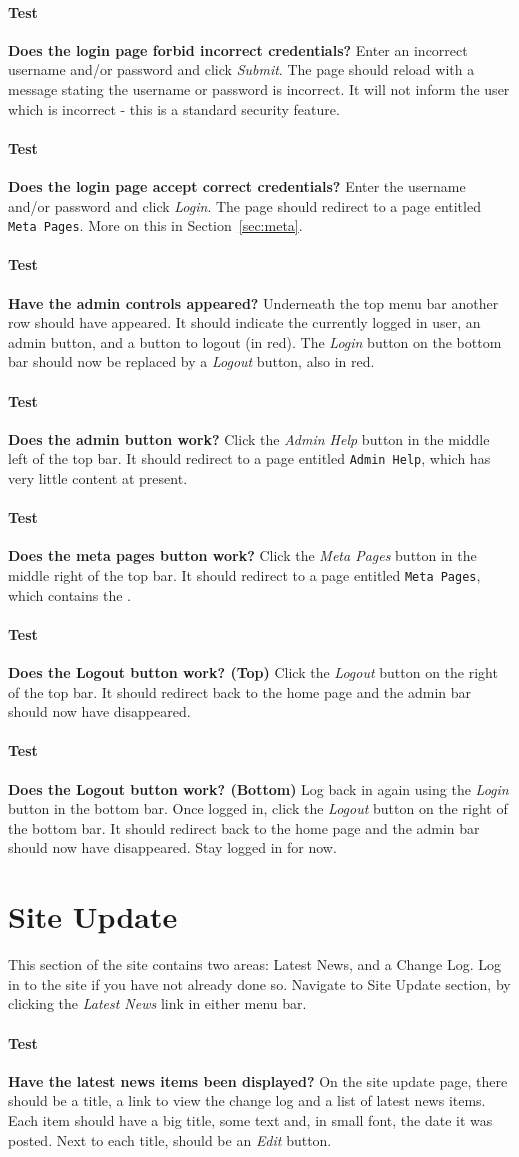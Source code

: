 \documentclass[12pt]{article}
\newcounter{Test}
\newcommand{\test}[1]{%
\stepcounter{Test}%
\paragraph{Test \theTest} \textbf{#1} }
\begin{document}
\test{Does the login page forbid incorrect credentials?}
Enter an incorrect username and/or password and click \textit{Submit}. The page should reload with a message stating the username or password is incorrect. It will not inform the user which is incorrect - this is a standard security feature.

\test{Does the login page accept correct credentials?}
Enter the username and/or password and click \textit{Login}. The page should redirect to a page entitled \texttt{Meta Pages}. More on this in Section~\ref{sec:meta}.

\test{Have the admin controls appeared?}
Underneath the top menu bar another row should have appeared. It should indicate the currently logged in user, an admin button, and a button to logout (in red). The \textit{Login} button on the bottom bar should now be replaced by a \textit{Logout} button, also in red.

\test{Does the admin button work?}
Click the \textit{Admin Help} button in the middle left of the top bar. It should redirect to a page entitled \texttt{Admin Help}, which has very little content at present.

\test{Does the meta pages button work?}
Click the \textit{Meta Pages} button in the middle right of the top bar. It should redirect to a page entitled \texttt{Meta Pages}, which contains the .

\test{Does the Logout button work? (Top)}
Click the \textit{Logout} button on the right of the top bar. It should redirect back to the home page and the admin bar should now have disappeared.

\test{Does the Logout button work? (Bottom)}
Log back in again using the \textit{Login} button in the bottom bar. Once logged in, click the \textit{Logout} button on the right of the bottom bar. It should redirect back to the home page and the admin bar should now have disappeared. Stay logged in for now.

\section{Site Update}\label{sec:siteUpdate}
This section of the site contains two areas: Latest News, and a Change Log. Log in to the site if you have not already done so. Navigate to Site Update section, by clicking the \textit{Latest News} link in either menu bar.

\test{Have the latest news items been displayed?}
On the site update page, there should be a title, a link to view the change log and a list of latest news items. Each item should have a big title, some text and, in small font, the date it was posted. Next to each title, should be an \textit{Edit} button.
\end{document}
